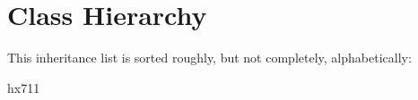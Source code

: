 \section{Class Hierarchy}
This inheritance list is sorted roughly, but not completely, alphabetically\+:\begin{DoxyCompactList}
\item {}
\item hx711\begin{DoxyCompactList}
\item {}
\end{DoxyCompactList}
\end{DoxyCompactList}
